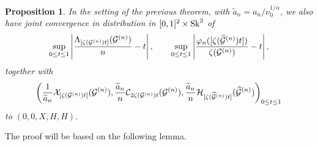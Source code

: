 \documentclass[11pt,a4paper]{article}
\newtheorem{prop}{Proposition}[section]
\begin{document}
\begin{prop}
\label{PropStep2} In the setting of the previous theorem, with $\widetilde{a}_n=a_n/\nu_0^{1/\alpha}$, we also have joint convergence in distribution in $[0,1]^2\times{\rm Sk}^3$ of 
$$\sup_{0\leq t\leq 1}\left|\frac{\Lambda_{[ \zeta( {\cal G}^{(n)}) t]}({\cal G}^{(n)} )}{ n}-t\right|,\qquad \sup_{0\leq t\leq 1}\left|\frac{\varphi_n([\zeta(\widehat{{\cal G}}^{(n)} ) t ])}{\zeta({\cal G}^{(n)} )}-t\right|,$$
together with
 \begin{equation}
\left(\frac{1}{\widetilde{a}_n}{\cal X}_{ [ \zeta( {\cal G}^{(n)}) t]}( {\cal G}^{(n)} ),
\frac{\widetilde{a}_n}{n}{\cal C}_{ 2 \zeta( {\cal G}^{(n)}) t}({\cal G}^{(n)} ),
\frac{\widetilde{a}_n}{n}{\cal H}_{  [\zeta( \widehat{{\cal G}}^{(n)} ) t]}( \widehat{{\cal G}}^{(n)}  )
\right)_{0\leq t\leq 1}\end{equation}
to $(0,0,X,H,H)$.
\end{prop}

The proof will be based on the following lemma.
\end{document}
